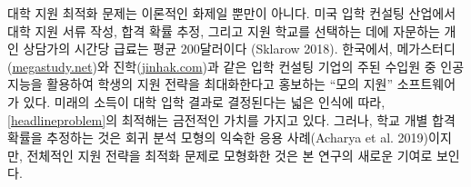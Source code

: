 \documentclass[11pt]{article} %
\newif\ifen
\theoremstyle{definition}
\theoremstyle{definition}
\begin{document}
\ifen
The college application problem is not solely of theoretical interest. In the American college consulting industry, students pay private consultants an average of \$200 per hour for assistance in preparing application materials, estimating their admissions odds, and identifying target schools (Sklarow 2018). In Korea, an important revenue stream for admissions consulting firms such as Megastudy (\url{megastudy.net}) and Jinhak (\url{jinhak.com}) is ``mock application'' software that claims to use artificial intelligence to optimize the client's application strategy.  Due to the widespread perception that career earnings depend on college admissions outcomes, the solution of \eqref{headlineproblem} holds monetary value. However, although predicting admissions outcomes on a school-by-school basis is a standard benchmark for regression models (Acharya et al. 2019), we believe our study is the first to formulate the overall application strategy as an optimization problem. 
\else
대학 지원 최적화 문제는 이론적인 화제일 뿐만이 아니다. 미국 입학 컨설팅 산업에서 대학 지원 서류 작성, 합격 확률 추정, 그리고 지원 학교를 선택하는 데에 자문하는 개인 상담가의 시간당 급료는 평균 200달러이다 (Sklarow 2018). 한국에서, 메가스터디(\url{megastudy.net})와 진학(\url{jinhak.com})과 같은 입학 컨설팅 기업의 주된 수입원 중 인공지능을 활용하여 학생의 지원 전략을 최대화한다고 홍보하는 ``모의 지원'' 소프트웨어가 있다. 미래의 소득이 대학 입학 결과로 결정된다는 넓은 인식에 따라, \eqref{headlineproblem}의 최적해는 금전적인 가치를 가지고 있다. 그러나, 학교 개별 합격 확률을 추정하는 것은 회귀 분석 모형의 익숙한 응용 사례(Acharya et al. 2019)이지만, 전체적인 지원 전략을 최적화 문제로 모형화한 것은 본 연구의 새로운 기여로 보인다.
\fi
\end{document}
